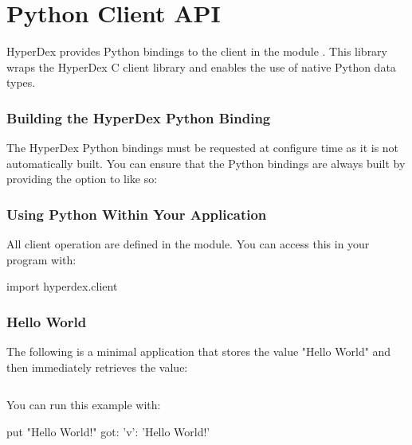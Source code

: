 \chapter{Python Client API}
\label{chap:api:python-client}

HyperDex provides Python bindings to the client in the module
.  This library wraps the HyperDex C client library and
enables the use of native Python data types.

\subsection{Building the HyperDex Python Binding}
\label{sec:api:python-client:building}

The HyperDex Python bindings must be requested at configure time as it is not
automatically built.  You can ensure that the Python bindings are always built
by providing the  option to 
like so:

\begin{consolecode}
\end{consolecode}

\subsection{Using Python Within Your Application}
\label{sec:api:python-client:using}

All client operation are defined in the  module.  You can
access this in your program with:

\begin{pythoncode}
import hyperdex.client
\end{pythoncode}

\subsection{Hello World}
\label{sec:api:python-client:hello-world}

The following is a minimal application that stores the value "Hello World" and
then immediately retrieves the value:

\inputminted{python}{\topdir/python/client/hello-world.py}

You can run this example with:

\begin{consolecode}
put "Hello World!"
got:
{'v': 'Hello World!'}
\end{consolecode}

